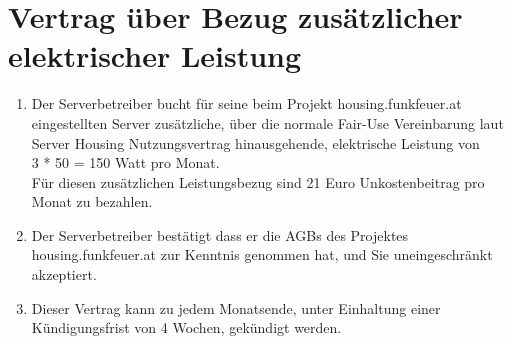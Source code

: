 \documentclass[parskip=half]{scrreprt}
\begin{document}
\chapter*{Vertrag über Bezug zusätzlicher elektrischer Leistung}


\begin{contract}
\begin{enumerate}
\item Der Serverbetreiber bucht für seine beim Projekt housing.funkfeuer.at eingestellten Server zusätzliche, über die normale Fair-Use Vereinbarung laut Server Housing Nutzungsvertrag hinausgehende, elektrische Leistung von
\vspace{0.2cm}\\
\hspace*{3mm}3 * 50 = 150 Watt pro Monat.
\vspace{0.2cm}\\
Für diesen zusätzlichen Leistungsbezug sind 21 Euro Unkostenbeitrag pro Monat zu bezahlen.
\item Der Serverbetreiber bestätigt dass er die AGBs des Projektes housing.funkfeuer.at zur Kenntnis genommen hat, und Sie uneingeschränkt akzeptiert.
\item Dieser Vertrag kann zu jedem Monatsende, unter Einhaltung einer Kündigungsfrist von 4 Wochen, gekündigt werden.
\end{enumerate}
\end{contract}


\end{document}
